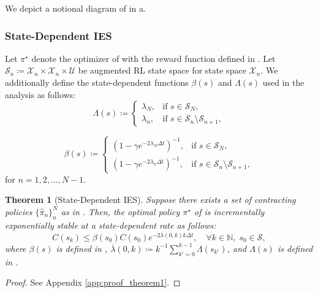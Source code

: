 \documentclass[lettersize,journal]{IEEEtran}
\newcommand{\mc}{\mathcal}
\newcommand{\mb}{\mathbb}
\newtheorem{theorem}{Theorem}
\begin{document}
We depict a notional diagram of  in a.



\subsubsection{State-Dependent IES}
Let $\pi^\star$ denote the optimizer of  with the reward function defined in .
Let $\mc{S}_n \coloneq \mc{X}_n \times \mc{X}_n \times \mc{U}$ be augmented RL state space for state space $\mc{X}_n$.
We additionally define the state-dependent functions $\beta(s)$ and $\Lambda(s)$ used in the analysis as follows:
\begin{equation}\label{eqn:Lambda_function}
    \Lambda(s) \coloneqq 
    \begin{cases}
        \lambda_N, & \text{if } s \in \mc{S}_N, \\
        \lambda_n, & \text{if } s \in \mc{S}_n \setminus \mc{S}_{n+1},
    \end{cases}
\end{equation}

\begin{equation}\label{eqn:beta_function}
    \beta(s) \coloneqq 
    \begin{cases}
        (1-\gamma e^{-2 \lambda_N \Delta t})^{-1}, & \text{if } s \in \mc{S}_N, \\
        (1-\gamma e^{-2 \lambda_n \Delta t})^{-1}, & \text{if } s \in \mc{S}_n \setminus \mc{S}_{n+1},
    \end{cases}
\end{equation}
for $n = 1, 2, \dots, N-1$.

    

\begin{theorem}[State-Dependent IES]\label{theorem:acc_exp_stability_C}
    Suppose there exists a set of contracting policies $\{ \hat \pi_n\}_{n}^N$ as in .
    Then, the optimal policy $\pi^\star$ of  is incrementally exponentially stable at a state-dependent rate as follows:
    \begin{equation}\label{eqn:sd_IES}
       C(s_{k}) \leq \beta(s_0) C(s_0) e^{- 2 \overline{\lambda}(0, k) k \Delta t}, \quad \forall k \in \mb{N}, \; s_0 \in \mc{S},
    \end{equation}
    where $\beta(s)$ is defined in , $\overline{\lambda}(0, k) \coloneq k^{-1} \sum_{k'=0}^{k-1} \Lambda(s_{k'})$, and $\Lambda(s)$ is defined in .
\end{theorem}
\begin{proof}
    See Appendix \ref{app:proof_theorem1}.
\end{proof}
\end{document}

